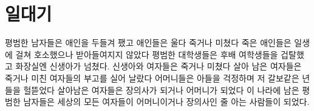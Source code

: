 \hypertarget{uxc77cuxb300uxae30}{%

\chapter{일대기}\label{uxc77cuxb300uxae30}}



평범한 남자들은 애인을 두들겨 팼고 애인들은 울다 죽거나 미쳤다 죽은 애인들은 일생에 걸쳐 호소했으나 받아들여지지 않았다 평범한 대학생들은 후배 여학생들을 겁탈했고 화장실엔 신생아가 넘쳤다. 신생아와 여자들은 죽거나 미쳤다 살아 남은 여자들은 죽거나 미친 여자들의 부고를 실어 날랐다 어머니들은 아들을 걱정하며 저 갈보같은 년들을 헐뜯었다 살아남은 여자들은 장의사가 되거나 어머니가 되었다 이 나라에 남은 평범한 남자들은 세상의 모든 여자들이 어머니이거나 장의사인 줄 아는 사람들이 되었다.

